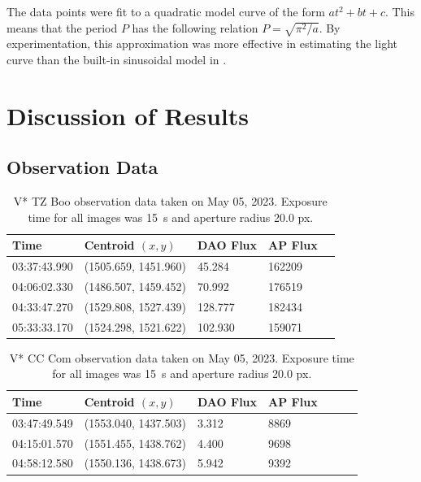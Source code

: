 \documentclass[12pt]{article}
\begin{document}
The data points were fit to a quadratic model curve of the form $at^2 + bt + c$. This means that the period $P$ has the following relation $P=\sqrt{\pi^2 / a} $. By experimentation, this approximation was more effective in estimating the light curve than the built-in sinusoidal model in .

\section{Discussion of Results}

\subsection{Observation Data}

\begin{table}[htpb]
\centering
\begin{tabular}{lllll}
    \toprule
\textbf{Time} & \textbf{Centroid} $(x, y)$ & \textbf{DAO Flux} & \textbf{AP Flux} \\
\midrule
03:37:43.990  & (1505.659, 1451.960)                     & 45.284            & 162209                            \\
04:06:02.330  & (1486.507, 1459.452)                     & 70.992            & 176519                            \\
04:33:47.270  & (1529.808, 1527.439)                     & 128.777           & 182434                            \\
05:33:33.170  & (1524.298, 1521.622)                     & 102.930           & 159071                           \\
\bottomrule
\end{tabular}
\caption{V* TZ Boo observation data taken on May 05, 2023. Exposure time for all images was \SI{15}{\s} and aperture radius 20.0 px.}
\end{table}

\begin{table}[htpb]
\centering
\begin{tabular}{lllllll}
    \toprule
\textbf{Time} & \textbf{Centroid} $(x, y)$ & \textbf{DAO Flux} & \textbf{AP Flux} \\
\midrule
03:47:49.549  & (1553.040, 1437.503)                     & 3.312             & 8869      \\
04:15:01.570  & (1551.455, 1438.762)                     & 4.400             & 9698                              \\
04:58:12.580  & (1550.136, 1438.673)                     & 5.942             & 9392                              \\
\bottomrule
\end{tabular}
\caption{V* CC Com observation data taken on May 05, 2023. Exposure time for all images was \SI{15}{\s} and aperture radius 20.0 px.}
\end{table}
\end{document}
